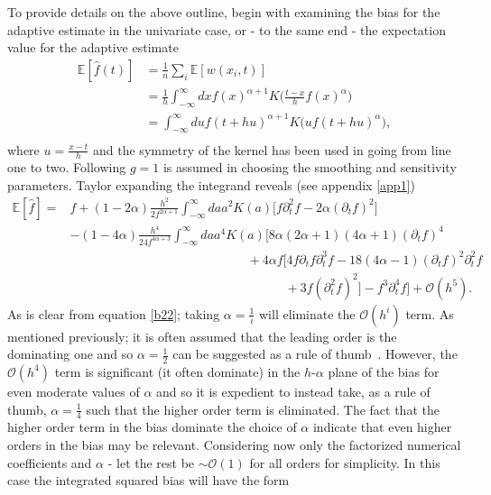 \documentclass[
twoside,
openright,
titlepage,
numbers=noenddot,
headinclude,%
footinclude=true,
dottedtoc, %
ngerman,
american, %
pagesize=pdftex,
]{book}
\begin{document}
	\noindent To provide details on the above outline, begin with examining the bias for the adaptive estimate in the univariate case, or - to the same end - the expectation value for the adaptive estimate
	\begin{equation}
		\begin{split}
			\mathbb{E}[\hat{f}(t)]&=\frac{1}{n}\sum_i\mathbb{E}[w(x_i,t)]\\
			&=\frac{1}{h}\int_{-\infty}^{\infty} dx f(x)^{\alpha+1} K\bigg(\frac{t-x}{h}f(x)^\alpha\bigg)\\
			&=\int_{-\infty}^{\infty} du f(t+hu)^{\alpha+1} K\big(uf(t+hu)^\alpha\big),\\
		\end{split}
		\label{b1}
	\end{equation}
	where $u=\frac{x-t}{h}$ and the symmetry of the kernel has been used in going from line one to two. Following \citet{Silverman86} $g=1$ is assumed in choosing the smoothing and sensitivity parameters. Taylor expanding the integrand reveals (see appendix \ref{app1})
	\begin{equation}
		\begin{split}
			\mathbb{E}[\hat{f}]=&f+(1-2\alpha)\frac{h^2}{2f^{2\alpha+1}}\int_{-\infty}^{\infty} da a^2K(a)\big[f\partial_t^2f-2\alpha(\partial_tf)^2\big]\\
			&-(1-4\alpha)\frac{h^4}{24f^{4\alpha +3}}\int_{-\infty}^{\infty} da a^4 K(a)\big[8\alpha(2\alpha+1)(4\alpha+1)(\partial_tf)^4\\
			&\qquad\qquad\qquad\qquad\qquad\qquad\qquad+4\alpha f[4f\partial_tf \partial_t^3f-18(4\alpha-1)(\partial_tf)^2\partial_t^2f\\
			&\qquad\qquad\qquad\qquad\qquad\qquad\qquad\qquad\quad+3f(\partial_t^2f)^2]-f^3\partial_t^4f
			\big]+\mathcal{O}(h^5).
		\end{split}
		\label{b22}
	\end{equation}
	As is clear from equation \eqref{b22}; taking $\alpha=\frac{1}{i}$ will eliminate the $\mathcal{O}(h^i)$ term. As mentioned previously; it is often assumed that the leading order is the dominating one and so $\alpha=\frac{1}{2}$ can be suggested as a rule of thumb~\citep{Silverman86}. However, the $\mathcal{O}(h^4)$ term is significant (it often dominate) in the $h$-$\alpha$ plane of the bias for even moderate values of $\alpha$ and so it is expedient to instead take, as a rule of thumb, $\alpha=\frac{1}{4}$ such that the higher order term is eliminated. The fact that the higher order term in the bias dominate the choice of $\alpha$ indicate that even higher orders in the bias may be relevant. Considering now only the factorized numerical coefficients and $\alpha$ - let the rest be $\sim\mathcal{O}(1)$ for all orders for simplicity. In this case the integrated squared bias will have the form
\end{document}
